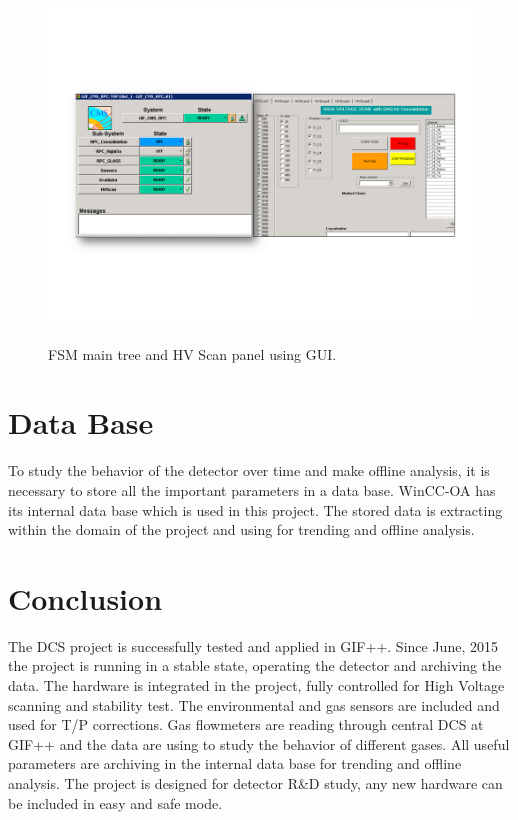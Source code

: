 \documentclass[a4paper,11pt]{article}
\begin{document}
\begin{figure}[H]
\centering
\hspace{-0.50cm}
\includegraphics[scale=0.66,trim=30 150 30 140,clip]{images/GUI.png}\\
 \caption{FSM main tree and HV Scan panel using GUI.}
\label{gui}
\end{figure}

\section{Data Base}
To study the behavior of the detector over time and make offline analysis, it is necessary to store all the important parameters in a data base. WinCC-OA has its internal data base which is used in this project. The stored data is extracting within the domain of the project and using for trending and offline analysis.  

\section{Conclusion} 
The DCS project is successfully tested and applied in GIF++. Since June, 2015 the project is running in a stable state, operating the detector and archiving the data. The hardware is integrated in the project, fully controlled for High Voltage scanning and stability test. The environmental and gas sensors are included and used for T/P corrections. Gas flowmeters are reading through central DCS at GIF++ and the data are using to study the behavior of different gases. All useful parameters are archiving in the internal data base for trending and offline analysis. The project is designed for detector R\&D study, any new hardware can be included in easy and safe mode.  
\end{document}
